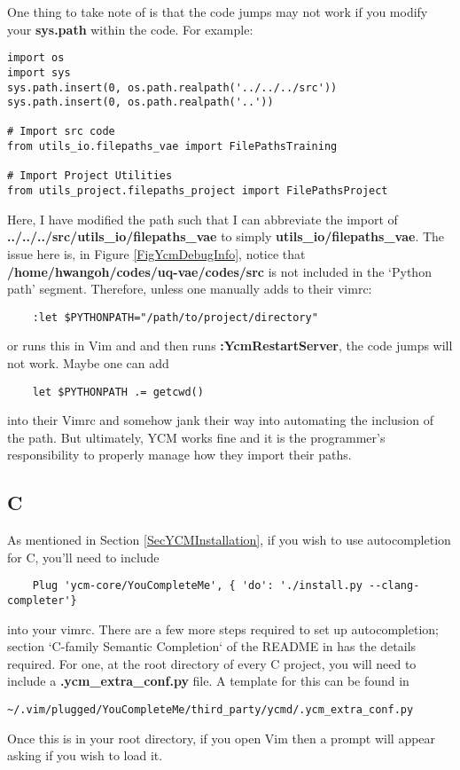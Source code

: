 One thing to take note of is that the code jumps may not work if you modify your
\textbf{sys.path} within the code. For example:
\begin{lstlisting}
import os
import sys
sys.path.insert(0, os.path.realpath('../../../src'))
sys.path.insert(0, os.path.realpath('..'))

# Import src code
from utils_io.filepaths_vae import FilePathsTraining

# Import Project Utilities
from utils_project.filepaths_project import FilePathsProject
\end{lstlisting}
Here, I have modified the path such that I can abbreviate the import of
\textbf{../../../src/utils\_io/filepaths\_vae} to simply
\textbf{utils\_io/filepaths\_vae}. The issue here is, in Figure
\ref{FigYcmDebugInfo}, notice that \textbf{/home/hwangoh/codes/uq-vae/codes/src}
is not included in the `Python path' segment. Therefore, unless one manually
adds to their vimrc:
\begin{lstlisting}
    :let $PYTHONPATH="/path/to/project/directory"
\end{lstlisting}
or runs this in Vim and and then runs \textbf{:YcmRestartServer}, the code jumps
will not work. Maybe one can add
\begin{lstlisting}
    let $PYTHONPATH .= getcwd()
\end{lstlisting}
into their Vimrc and somehow jank their way into automating the inclusion of the
path. But ultimately, YCM works fine and it is the programmer's responsibility
to properly manage how they import their paths.

\subsection{C} \label{SecYCMC}
As mentioned in Section \ref{SecYCMInstallation}, if you wish to use
autocompletion for C, you'll need to include
\begin{lstlisting}
    Plug 'ycm-core/YouCompleteMe', { 'do': './install.py --clang-completer'}
\end{lstlisting}
into your vimrc. There are a few more steps required to set up autocompletion;
section `C-family Semantic Completion` of the README in \cite{ycmcore2017ycm}
has the details required. For one, at the root directory of every C project, you
will need to include a \textbf{.ycm\_extra\_conf.py} file. A template for this
can be found in
\begin{lstlisting}
~/.vim/plugged/YouCompleteMe/third_party/ycmd/.ycm_extra_conf.py
\end{lstlisting}
Once this is in your root directory, if you open Vim then a prompt will appear
asking if you wish to load it.\\

